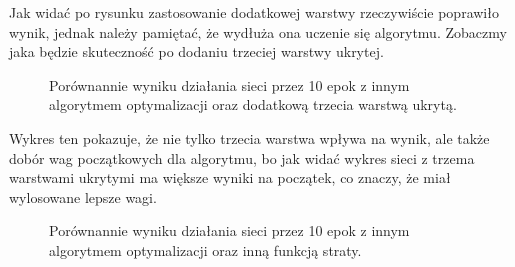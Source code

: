 \documentclass{article}
\begin{document}
Jak widać po rysunku zastosowanie dodatkowej warstwy rzeczywiście poprawiło wynik,
jednak należy pamiętać, że wydłuża ona uczenie się algorytmu.
Zobaczmy jaka będzie skuteczność po dodaniu trzeciej warstwy ukrytej.

\begin{figure}[H]
  \centering
  \caption{Porównannie wyniku działania sieci przez 10 epok
  z innym algorytmem optymalizacji oraz dodatkową trzecia warstwą ukrytą.}
\end{figure}

Wykres ten pokazuje, że nie tylko trzecia warstwa wpływa na wynik, ale także dobór wag początkowych dla algorytmu,
bo jak widać wykres sieci z trzema warstwami ukrytymi ma większe wyniki na początek, co znaczy, że miał wylosowane lepsze wagi.

\begin{figure}[H]
  \centering
  \caption{Porównannie wyniku działania sieci przez 10 epok
  z innym algorytmem optymalizacji oraz inną funkcją straty.}
\end{figure}
\end{document}
